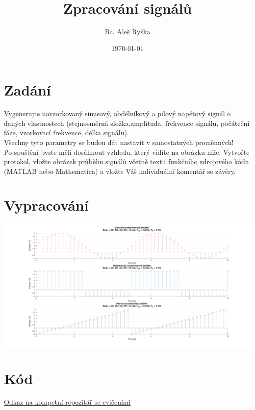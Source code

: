 \documentclass{article}
\title{Zpracování signálů} %
\author{Bc. Aleš Ryška} %
\date{\today} %
\begin{document}
\maketitle %



\section{Zadání}
Vygenerujte navzorkovaný sinusový, obdélníkový a pilový napěťový signál o daných vlastnostech (stejnosměrná složka,amplituda, frekvence signálu, počáteční fáze, vzorkovací frekvence, délka signálu).\\
Všechny tyto parametry se budou dát nastavit v samostatných proměnných!\\
Po spuštění byste měli dosáhnout vzhledu, který vidíte na obrázku níže. Vytvořte protokol, vložte obrázek průběhu signálů včetně textu funkčního zdrojového kódu (MATLAB nebo Mathematica) a vložte Váš individuální komentář se závěry.
\section{Vypracování}
\includegraphics[scale=0.25]{../assets/img.png}
\newpage
\section{Kód}

\href{https://github.com/AleshR/AP8ZS}{Odkaz na kompetní repozitář se cvičeními}
\end{document}
